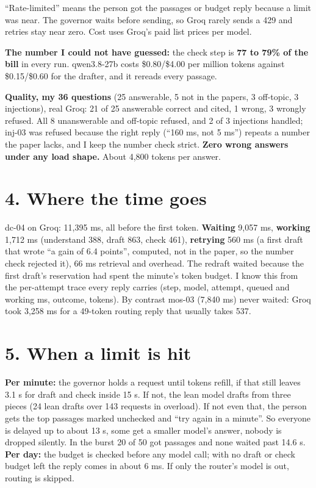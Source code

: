 \documentclass[10pt]{article}
\begin{document}
``Rate-limited'' means the person got the passages or budget reply because a limit was near. The governor waits before sending, so Groq rarely sends a 429 and retries stay near zero. Cost uses Groq's paid list prices per model.

\textbf{The number I could not have guessed:} the check step is \textbf{77 to 79\% of the bill} in every run. qwen3.8-27b costs \$0.80/\$4.00 per million tokens against \$0.15/\$0.60 for the drafter, and it rereads every passage.

\textbf{Quality, my 36 questions} (25 answerable, 5 not in the papers, 3 off-topic, 3 injections), real Groq: 21 of 25 answerable correct and cited, 1 wrong, 3 wrongly refused. All 8 unanswerable and off-topic refused, and 2 of 3 injections handled; inj-03 was refused because the right reply (``160 ms, not 5 ms'') repeats a number the paper lacks, and I keep the number check strict. \textbf{Zero wrong answers under any load shape.} About 4,800 tokens per answer.

\section*{4. Where the time goes}

dc-04 on Groq: 11,395 ms, all before the first token. \textbf{Waiting} 9,057 ms, \textbf{working} 1,712 ms (understand 388, draft 863, check 461), \textbf{retrying} 560 ms (a first draft that wrote ``a gain of 6.4 points'', computed, not in the paper, so the number check rejected it), 66 ms retrieval and overhead. The redraft waited because the first draft's reservation had spent the minute's token budget. I know this from the per-attempt trace every reply carries (step, model, attempt, queued and working ms, outcome, tokens). By contrast mos-03 (7,840 ms) never waited: Groq took 3,258 ms for a 49-token routing reply that usually takes 537.

\section*{5. When a limit is hit}

\textbf{Per minute:} the governor holds a request until tokens refill, if that still leaves 3.1 s for draft and check inside 15 s. If not, the lean model drafts from three pieces (24 lean drafts over 143 requests in overload). If not even that, the person gets the top passages marked unchecked and ``try again in a minute''. So everyone is delayed up to about 13 s, some get a smaller model's answer, nobody is dropped silently. In the burst 20 of 50 got passages and none waited past 14.6 s. \textbf{Per day:} the budget is checked before any model call; with no draft or check budget left the reply comes in about 6 ms. If only the router's model is out, routing is skipped.
\end{document}
